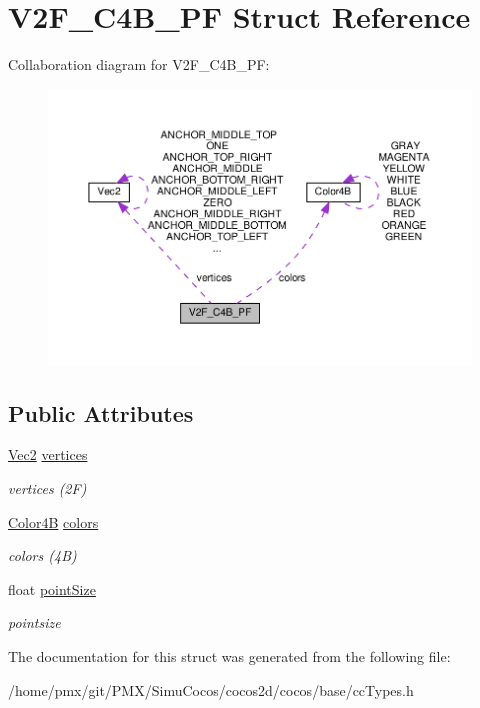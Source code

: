 \hypertarget{structV2F__C4B__PF}{}\section{V2\+F\+\_\+\+C4\+B\+\_\+\+PF Struct Reference}
\label{structV2F__C4B__PF}


Collaboration diagram for V2\+F\+\_\+\+C4\+B\+\_\+\+PF\+:
\nopagebreak
\begin{figure}[H]
\begin{center}
\leavevmode
\includegraphics[width=350pt]{structV2F__C4B__PF__coll__graph}
\end{center}
\end{figure}
\subsection*{Public Attributes}
\begin{DoxyCompactItemize}
\item 
\mbox{\label{structV2F__C4B__PF_a27074aab5b2b3a5be974ee4ab84c8eea}} 
\hyperlink{classVec2}{Vec2} \hyperlink{structV2F__C4B__PF_a27074aab5b2b3a5be974ee4ab84c8eea}{vertices}
\begin{DoxyCompactList}\small\item\em vertices (2F) \end{DoxyCompactList}\item 
\mbox{\label{structV2F__C4B__PF_a9b4d0bc35446ecd118c2009d3942dc82}} 
\hyperlink{structColor4B}{Color4B} \hyperlink{structV2F__C4B__PF_a9b4d0bc35446ecd118c2009d3942dc82}{colors}
\begin{DoxyCompactList}\small\item\em colors (4B) \end{DoxyCompactList}\item 
\mbox{\label{structV2F__C4B__PF_a53b2e486c9104a966807e33a56cc7e10}} 
float \hyperlink{structV2F__C4B__PF_a53b2e486c9104a966807e33a56cc7e10}{point\+Size}
\begin{DoxyCompactList}\small\item\em pointsize \end{DoxyCompactList}\end{DoxyCompactItemize}


The documentation for this struct was generated from the following file\+:\begin{DoxyCompactItemize}
\item 
/home/pmx/git/\+P\+M\+X/\+Simu\+Cocos/cocos2d/cocos/base/cc\+Types.\+h\end{DoxyCompactItemize}

